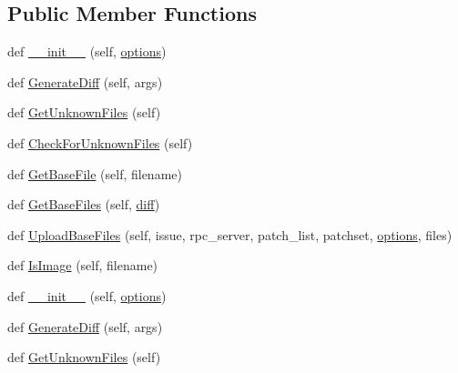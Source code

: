 \subsection*{Public Member Functions}
\begin{DoxyCompactItemize}
\item 
def \mbox{\hyperlink{classupload_1_1_version_control_system_ace97e5785a2b40011404ae6fbb956ecf}{\+\_\+\+\_\+init\+\_\+\+\_\+}} (self, \mbox{\hyperlink{classupload_1_1_version_control_system_a4d57d043bc408887b94269fe4cea9556}{options}})
\item 
def \mbox{\hyperlink{classupload_1_1_version_control_system_aa5eb260c96e7016dab36b5fc136c9f49}{Generate\+Diff}} (self, args)
\item 
def \mbox{\hyperlink{classupload_1_1_version_control_system_a56a60e56aa9aff3df4001d2f84cab884}{Get\+Unknown\+Files}} (self)
\item 
def \mbox{\hyperlink{classupload_1_1_version_control_system_ad2923d691a1b1047e9359c5b7c1c103f}{Check\+For\+Unknown\+Files}} (self)
\item 
def \mbox{\hyperlink{classupload_1_1_version_control_system_adfd9d4ecba422102233a2ba13e5bfaf5}{Get\+Base\+File}} (self, filename)
\item 
def \mbox{\hyperlink{classupload_1_1_version_control_system_a812c3b3daf90c88b015fa4b26252e291}{Get\+Base\+Files}} (self, \mbox{\hyperlink{_mutual_8cpp_ae6c31fc00bc7f0cfda97440db3377063}{diff}})
\item 
def \mbox{\hyperlink{classupload_1_1_version_control_system_a7e334f967301b9e85e5a9c39f5036823}{Upload\+Base\+Files}} (self, issue, rpc\+\_\+server, patch\+\_\+list, patchset, \mbox{\hyperlink{classupload_1_1_version_control_system_a4d57d043bc408887b94269fe4cea9556}{options}}, files)
\item 
def \mbox{\hyperlink{classupload_1_1_version_control_system_a846889ecd2ef40870b456ddb5b349e02}{Is\+Image}} (self, filename)
\item 
def \mbox{\hyperlink{classupload_1_1_version_control_system_ace97e5785a2b40011404ae6fbb956ecf}{\+\_\+\+\_\+init\+\_\+\+\_\+}} (self, \mbox{\hyperlink{classupload_1_1_version_control_system_a4d57d043bc408887b94269fe4cea9556}{options}})
\item 
def \mbox{\hyperlink{classupload_1_1_version_control_system_aa5eb260c96e7016dab36b5fc136c9f49}{Generate\+Diff}} (self, args)
\item 
def \mbox{\hyperlink{classupload_1_1_version_control_system_a56a60e56aa9aff3df4001d2f84cab884}{Get\+Unknown\+Files}} (self)

\end{DoxyCompactItemize}
